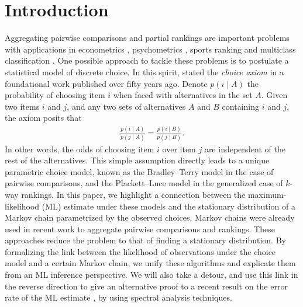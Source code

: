 \section{Introduction}
\label{sec:intro}

Aggregating pairwise comparisons and partial rankings are important problems with applications in econometrics \citep{mcfadden1973conditional}, psychometrics \citep{thurstone1927method, bradley1952rank}, sports ranking \citep{plackett1975analysis, elo1978rating} and multiclass classification \citep{hastie1998classification}.
One possible approach to tackle these problems is to postulate a statistical model of discrete choice.
In this spirit, \citet{luce1959individual} stated the \emph{choice axiom} in a foundational work published over fifty years ago.
Denote $p(i \mid A)$ the probability of choosing item $i$ when faced with alternatives in the set $A$.
Given two items $i$ and $j$, and any two sets of alternatives $A$ and $B$ containing $i$ and $j$, the axiom posits that
\begin{align*}
\frac{p(i \mid A)}{p(j \mid A)}
= \frac{p(i \mid B)}{p(j \mid B)}.
\end{align*}
In other words, the odds of choosing item $i$ over item $j$ are independent of the rest of the alternatives.
This simple assumption directly leads to a unique parametric choice model, known as the Bradley--Terry model in the case of pairwise comparisons, and the Plackett--Luce model in the generalized case of $k$-way rankings.
In this paper, we highlight a connection between the maximum-likelihood (ML) estimate under these models and the stationary distribution of a Markov chain parametrized by the observed choices.
Markov chains were already used in recent work \citep{dwork2001rank, negahban2012iterative, azari2013generalized} to aggregate pairwise comparisons and rankings.
These approaches reduce the problem to that of finding a stationary distribution.
By formalizing the link between the likelihood of observations under the choice model and a certain Markov chain, we unify these algorithms and explicate them from an ML inference perspective.
We will also take a detour, and use this link in the reverse direction to give an alternative proof to a recent result on the error rate of the ML estimate \cite{hajek2014minimax}, by using spectral analysis techniques.

